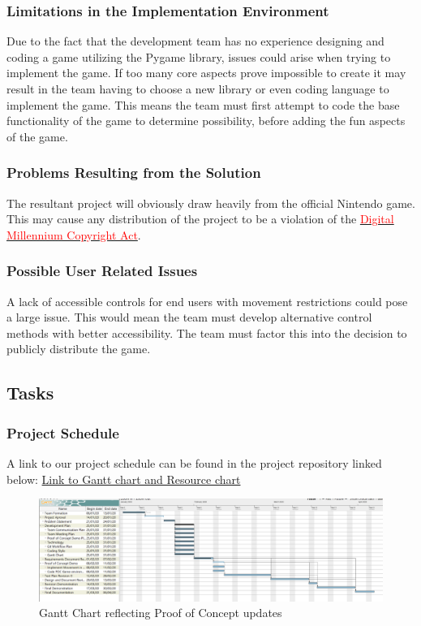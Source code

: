 \documentclass[12pt, titlepage]{article}
\begin{document}
\subsubsection{Limitations in the Implementation Environment}
Due to the fact that the development team has no experience designing and coding a game utilizing the Pygame library, issues could arise when trying to implement the game. If too many core aspects prove impossible to create it may result in the team having to choose a new library or even coding language to implement the game. This means the team must first attempt to code the base functionality of the game to determine possibility, before adding the fun aspects of the game.

\subsubsection{Problems Resulting from the Solution}
The resultant project will obviously draw heavily from the official Nintendo game. This may cause any distribution of the project to be a violation of the \href{https://www.copyright.gov/legislation/dmca.pdf}{\textcolor{red}{Digital Millennium Copyright Act}}.

\subsubsection{Possible User Related Issues}
A lack of accessible controls for end users with movement restrictions could pose a large issue. This would mean the team must develop alternative control methods with better accessibility. The team must factor this into the decision to publicly distribute the game.

\subsection{Tasks}
\subsubsection{Project Schedule}
A link to our project schedule can be found in the project repository linked below:
\href{https://gitlab.cas.mcmaster.ca/jandricd/super-refactored-mario-bros/tree/master/ProjectSchedule}{Link to Gantt chart and Resource chart}

\begin{figure}[H]
    \centering
    \includegraphics[width=\textwidth]{GanttChartSnapshotFeb9.png}
    \caption{Gantt Chart reflecting Proof of Concept updates}
    \label{fig:ganttchart}
\end{figure}
\end{document}
